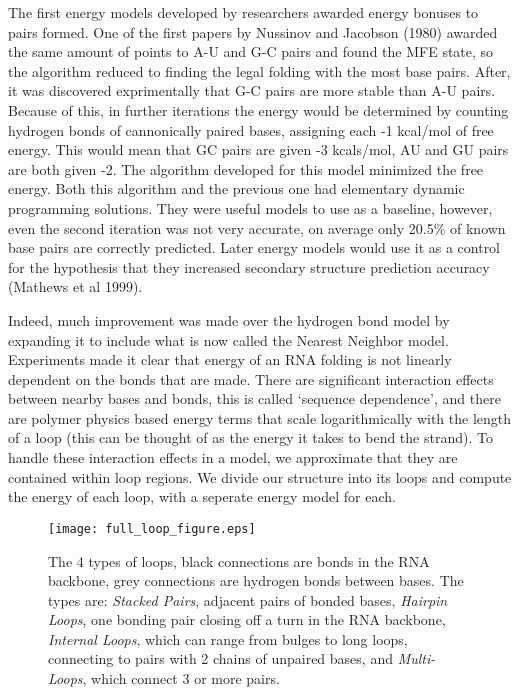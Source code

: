 The first energy models developed by researchers awarded energy
 bonuses to pairs formed. One of the first papers by Nussinov and
 Jacobson (1980) awarded the same amount of points to A-U and G-C
 pairs and found the MFE state, so the algorithm reduced to finding
 the legal folding with the most base pairs. After, it was discovered
 exprimentally that G-C pairs are more stable than A-U pairs. Because
 of this, in further iterations the energy would be determined by
 counting hydrogen bonds of cannonically paired bases, assigning each
 -1 kcal/mol of free energy. This would mean that GC pairs are given
 -3 kcals/mol, AU and GU pairs are both given -2. The algorithm
 developed for this model minimized the free energy. Both this
 algorithm and the previous one had elementary dynamic programming
 solutions. They were useful models to use as a baseline, however,
 even the second iteration was not very accurate, on average only
 20.5\% of known base pairs are correctly predicted. Later energy
 models would use it as a control for the hypothesis that they
 increased secondary structure prediction accuracy (Mathews et al
 1999).

Indeed, much improvement was made over the hydrogen bond model by
expanding it to include what is now called the Nearest Neighbor
model. Experiments made it clear that energy of an RNA folding is not
linearly dependent on the bonds that are made. There are significant
interaction effects between nearby bases and bonds, this is called
`sequence dependence', and there are polymer physics based energy
terms that scale logarithmically with the length of a loop (this can
be thought of as the energy it takes to bend the strand). To handle
these interaction effects in a model, we approximate that they are
contained within loop regions. We divide our structure into its loops
and compute the energy of each loop, with a seperate energy model for
each.

\begin{figure}[t]
\texttt{[image: full\_loop\_figure.eps]}
\caption{The 4 types of loops, black connections are bonds in the RNA
  backbone, grey connections are hydrogen bonds between bases. The
  types are: \textit{Stacked Pairs}, adjacent pairs of bonded bases,
  \textit{Hairpin Loops}, one bonding pair closing off a turn in the
  RNA backbone, \textit{Internal Loops}, which can range from bulges
  to long loops, connecting to pairs with 2 chains of unpaired bases,
  and \textit{Multi-Loops}, which  connect 3 or more pairs.}
\label{fig:loopFigure}
\end{figure}

